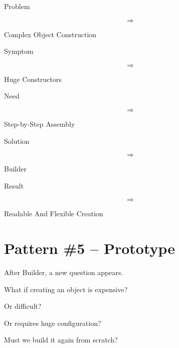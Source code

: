 \documentclass[11pt,a4paper]{book}
\begin{document}
\begin{compressionbox}

Problem

\[
\Rightarrow
\]

Complex Object Construction

\vspace{0.5em}

Symptom

\[
\Rightarrow
\]

Huge Constructors

\vspace{0.5em}

Need

\[
\Rightarrow
\]

Step-by-Step Assembly

\vspace{0.5em}

Solution

\[
\Rightarrow
\]

Builder

\vspace{0.5em}

Result

\[
\Rightarrow
\]

Readable And Flexible Creation

\end{compressionbox}
\section{Pattern \#5 -- Prototype}

After Builder, a new question appears.


What if creating an object
is expensive?


Or difficult?


Or requires huge configuration?


Must we build it again from scratch?

\end{document}

